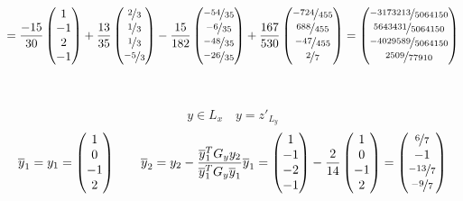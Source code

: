\documentclass{article}
\begin{document}
$$= \frac{-15}{30}\begin{pmatrix}
        1 \\ -1 \\ 2 \\ -1
    \end{pmatrix} + \frac{13}{35}\begin{pmatrix}
        \nicefrac{2}{3} \\ \nicefrac{1}{3} \\ \nicefrac{1}{3} \\ \nicefrac{-5}{3}
    \end{pmatrix} - \frac{15}{182}\begin{pmatrix}
        \nicefrac{-54}{35} \\ \nicefrac{-6}{35} \\ \nicefrac{-48}{35} \\ \nicefrac{-26}{35}
    \end{pmatrix} + \frac{167}{530}\begin{pmatrix}
        \nicefrac{-724}{455} \\ \nicefrac{688}{455} \\ \nicefrac{-47}{455} \\ \nicefrac{2}{7}
    \end{pmatrix} = \begin{pmatrix}
        \nicefrac{-3173213}{5064150} \\ \nicefrac{5643431}{5064150} \\ \nicefrac{-4029589}{5064150} \\ \nicefrac{2509}{77910}
    \end{pmatrix}$$ \, \\ \, \\
$$y \in L_x\quad y = z'_{L_y}$$
$$
    \overline{y}_1 = y_1 = \begin{pmatrix}
        1 \\ 0 \\ -1 \\ 2
    \end{pmatrix}\qquad \overline{y}_2 = y_2 - \frac{\overline{y}_1^TG_yy_2}{\overline{y}_1^TG_y\overline{y}_1}\overline{y}_1 = \begin{pmatrix}
        1 \\ -1 \\ -2 \\ -1
    \end{pmatrix} - \frac{2}{14}\begin{pmatrix}
        1 \\ 0 \\ -1 \\ 2
    \end{pmatrix} = \begin{pmatrix}
        \nicefrac{6}{7} \\ -1 \\ \nicefrac{-13}{7} \\ \nicefrac{-9}{7}
    \end{pmatrix}
$$
\end{document}
